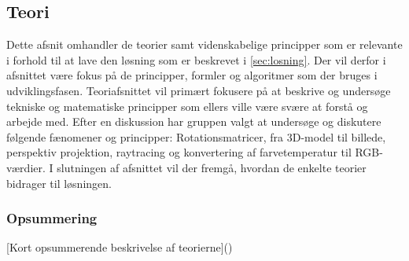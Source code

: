 \subsection{Teori}
\label{sec:teori}

Dette afsnit omhandler de teorier samt videnskabelige principper som er relevante i forhold til at lave den løsning som er beskrevet i \ref{sec:losning}. Der vil derfor i afsnittet være fokus på de principper, formler og algoritmer som der bruges i udviklingsfasen. Teoriafsnittet vil primært fokusere på at beskrive og undersøge tekniske og matematiske principper som ellers ville være svære at forstå og arbejde med. Efter en diskussion har gruppen valgt at undersøge og diskutere følgende fænomener og principper: Rotationsmatricer, fra 3D-model til billede, perspektiv projektion, raytracing og konvertering af farvetemperatur til RGB-værdier. I slutningen af afsnittet vil der fremgå, hvordan de enkelte teorier bidrager til løsningen.









\subsubsection*{Opsummering}

[Kort opsummerende beskrivelse af teorierne]()